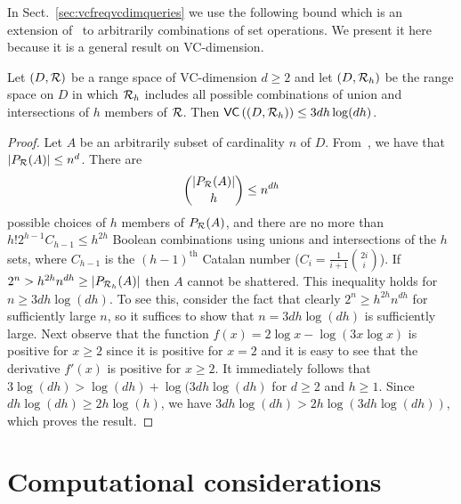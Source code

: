 In Sect.~\ref{sec:vcfreqvcdimqueries} we use the following bound
which is an extension of~\citep[Corol.~14.4.3]{AlonS08} to arbitrarily
combinations of set operations. We present it here because it is a general
result on VC-dimension.

\begin{lemma}\label{lem:genboolcomp}
   Let $(D,\mathcal{R})$ be a range space of VC-dimension $d\ge 2$ and let $(D,\mathcal{R}_h)$ be the
  range space on $D$ in which $\mathcal{R}_h$ includes all possible combinations of 
    union and intersections of $h$ members of $\mathcal{R}$. Then
    $\mathsf{VC}\left((D,\mathcal{R}_h)\right)\le 3dh\log(dh)$.
\end{lemma}

\begin{proof}
  Let $A$ be an arbitrarily subset of cardinality $n$ of $D$.
  From~\citep[Coroll.~14.4.2]{AlonS08}, we have that $|P_{\mathcal{R}}(A)|\le n^d$. There are 
  \[
  \binom{|P_{\mathcal{R}}(A)|}{h}\le  n^{dh} \]
  possible choices of $h$ members of $P_{\mathcal{R}}(A)$, and there are no more
  than $ h! 2^{h-1} C_{h-1}\leq h^{2h}$
  Boolean combinations using unions and intersections of the $h$ sets, where
  $C_{h-1}$ is the $(h-1)^{\mathrm{th}}$ Catalan number
  ($C_i=\frac{1}{i+1}\binom{2i}{i}$). If $2^n> h^{2h}n^{dh} \geq |P_{\mathcal{R}_h}(A)|$
  then $A$ cannot be shattered. This inequality holds for $n\ge 3dh\log(dh)$. To
  see this, consider the fact that clearly $2^n\ge h^{2h}n^{dh}$ for
  sufficiently large $n$, so it suffices to show that $n=3dh\log(dh)$ is
  sufficiently large. Next observe that the function $f(x)=2\log x-\log(3x\log
  x)$ is positive for $x\ge 2$ since it is positive for $x=2$ and it is easy to
  see that the derivative $f'(x)$ is positive for $x\ge 2$. It immediately
  follows that $3\log(dh)> \log(dh)+\log(3dh\log(dh)$ for $d\ge2$ and $h\ge1$.
  Since $dh\log(dh)\ge 2h\log(h)$, we have $3dh\log(dh)> 2h\log(3dh\log(dh))$,
  which proves the result.
\end{proof}

\section{Computational considerations}
